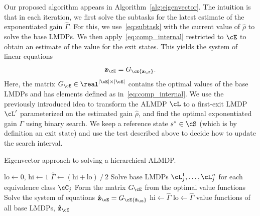 Our proposed algorithm appears in Algorithm~\ref{alg:eigenvector}. The intuition is that in each iteration, we first solve the subtasks for the latest estimate of the exponentiated gain $\widehat\Gamma$. For this, we use~\eqref{eq:subtask} with the current value of $\hat\rho$ to solve the base LMDPs. We then apply~\eqref{eq:comp_internal} restricted to $\cE$ to obtain an estimate of the value for the exit states. This yields the system of linear equations
\begin{equation}
    {\bf z_\cE} = G_\cE {\bf z_\cE}.\label{eq:eigenvector}
\end{equation}
Here, the matrix $G_\cE\in\real^{\lvert\cE\rvert\times \lvert\cE\rvert}$ contains the optimal values of the base LMDPs and has elements defined as in~\eqref{eq:comp_internal}. We use the previously introduced idea to transform the ALMDP $\cL$ to a first-exit LMDP $\cL'$ parameterized on the estimated gain $\hat\rho$, and find the optimal exponentiated gain $\Gamma$ using binary search. We keep a reference state $s^*\in\cS$ (which is by definition an exit state) and use the test described above to decide how to update the search interval. 
\begin{algorithm}[!b]
  \caption{Eigenvector approach to solving a hierarchical ALMDP.}
  \begin{algorithmic}[1]

    \State $\text{lo}\gets 0$, $\text{hi}\gets 1$
    \State $\widehat\Gamma \gets (\text{hi} + \text{lo}) \mathbin{/} 2$
    \State Solve base LMDPs $\cL_j^1,\ldots,\cL_j^n$ for each equivalence class $\cC_j$
    \State Form the matrix $G_\cE$ from the optimal value functions
    \State Solve the system of equations  ${\bf \hat z_\cE} = G_\cE {\bf\hat z_\cE}$
    \State $\text{hi}\gets \widehat\Gamma$
    \Else \State $\text{lo}\gets \widehat\Gamma$
    \EndIf
    \vspace*{3pt}
    \EndWhile
    \Return value functions of all base LMDPs, ${\bf \hat z_\cE}$
  \end{algorithmic}
  \label{alg:eigenvector}
\end{algorithm}

